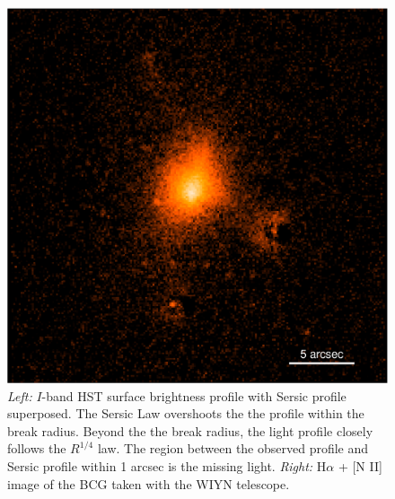 \documentclass[12pt]{article}
\begin{document}
\begin{figure}[ht]
\begin{center}
\begin{minipage}{0.47\linewidth}
      \includegraphics*[width=\textwidth]{MS0735_Halpha}
    \end{minipage}
    \caption{{\it{Left:}} $I$-band HST surface brightness profile with
      Sersic profile superposed. The Sersic Law overshoots the the
      profile within the break radius.  Beyond the the break radius,
      the light profile closely follows the $R^{1/4}$
      law. The region between the observed profile and Sersic profile within 1 arcsec is the missing light.
      {\it{Right:}} H$\alpha$ + [N II] image of the BCG taken with the WIYN telescope.}
    \label{fig}
  \end{center}
\end{figure}



%
%
\describeobservations   %
\end{document}
